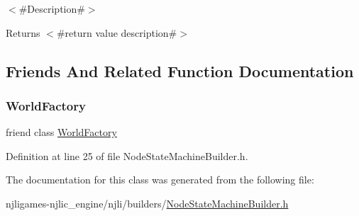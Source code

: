 $<$\#\+Description\#$>$

\begin{DoxyReturn}{Returns}
$<$\#return value description\#$>$ 
\end{DoxyReturn}


\subsection{Friends And Related Function Documentation}
\mbox{\label{classnjli_1_1_node_state_machine_builder_acb96ebb09abe8f2a37a915a842babfac}} 
\subsubsection{\texorpdfstring{World\+Factory}{WorldFactory}}
{\footnotesize\ttfamily friend class \mbox{\hyperlink{classnjli_1_1_world_factory}{World\+Factory}}\hspace{0.3cm}{\ttfamily [friend]}}



Definition at line 25 of file Node\+State\+Machine\+Builder.\+h.



The documentation for this class was generated from the following file\+:\begin{DoxyCompactItemize}
\item 
njligames-\/njlic\+\_\+engine/njli/builders/\mbox{\hyperlink{_node_state_machine_builder_8h}{Node\+State\+Machine\+Builder.\+h}}\end{DoxyCompactItemize}
